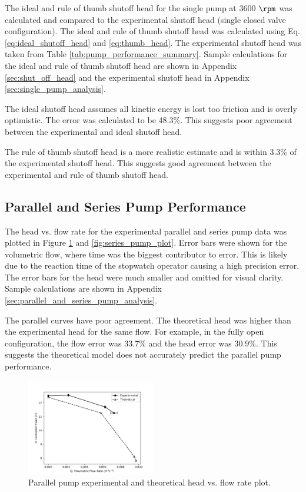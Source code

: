\noindent The ideal and rule of thumb shutoff head for the single pump at 3600 $\unit{\rpm}$ was calculated and compared to the experimental shutoff head (single closed valve configuration). The ideal and rule of thumb shutoff head was calculated using Eq. \ref{eq:ideal_shutoff_head} and \ref{eq:thumb_head}. The experimental shutoff head was taken from Table \ref{tab:pump_performance_summary}. Sample calculations for the ideal and rule of thumb shutoff head are shown in Appendix \ref{sec:shut_off_head} and the experimental shutoff head in Appendix \ref{sec:single_pump_analysis}.

The ideal shutoff head assumes all kinetic energy is lost too friction and is overly optimistic. The error was calculated to be 48.3\%. This suggests poor agreement between the experimental and ideal shutoff head.

The rule of thumb shutoff head is a more realistic estimate and is within 3.3\% of the experimental shutoff head. This suggests good agreement between the experimental and rule of thumb shutoff head.

\subsection{Parallel and Series Pump Performance}
The head vs. flow rate for the experimental parallel and series pump data was plotted in Figure \ref{fig:parallel_pump_plot} and \ref{fig:series_pump_plot}.
Error bars were shown for the volumetric flow, where time was the biggest contributor to error. This is likely due to the reaction time of the stopwatch operator causing a high precision error. The error bars for the head were much smaller and omitted for visual clarity. Sample calculations are shown in Appendix \ref{sec:parallel_and_series_pump_analysis}.

The parallel curves have poor agreement. The theoretical head was higher than the experimental head for the same flow. For example, in the fully open configuration, the flow error was 33.7\% and the head error was 30.9\%. This suggests the theoretical model does not accurately predict the parallel pump performance.
\begin{figure}[H]
    \centering
    \includegraphics[width=0.5\textwidth]{Sections/Figures/Parallel Pump Plot.png}
    \caption{Parallel pump experimental and theoretical head vs. flow rate plot.}
    \label{fig:parallel_pump_plot}
\end{figure}

